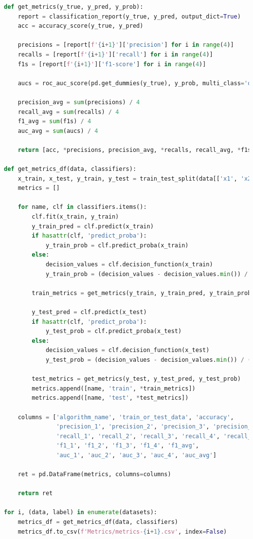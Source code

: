 \begin{lstlisting}[language=Python, caption=Generating metrics for all datasets and save them in CSV files, label={lst:Q4}]
def get_metrics(y_true, y_pred, y_prob):
    report = classification_report(y_true, y_pred, output_dict=True)
    acc = accuracy_score(y_true, y_pred)
    
    precisions = [report[f'{i+1}']['precision'] for i in range(4)]
    recalls = [report[f'{i+1}']['recall'] for i in range(4)]
    f1s = [report[f'{i+1}']['f1-score'] for i in range(4)]
    
    aucs = roc_auc_score(pd.get_dummies(y_true), y_prob, multi_class='ovr', average=None)
    
    precision_avg = sum(precisions) / 4
    recall_avg = sum(recalls) / 4
    f1_avg = sum(f1s) / 4
    auc_avg = sum(aucs) / 4
    
    return [acc, *precisions, precision_avg, *recalls, recall_avg, *f1s, f1_avg, *aucs, auc_avg]

def get_metrics_df(data, classifiers):
    x_train, x_test, y_train, y_test = train_test_split(data[['x1', 'x2']], data['y'], test_size=0.2, random_state=42)
    metrics = []

    for name, clf in classifiers.items():
        clf.fit(x_train, y_train) 
        y_train_pred = clf.predict(x_train)
        if hasattr(clf, 'predict_proba'):
            y_train_prob = clf.predict_proba(x_train)
        else:
            decision_values = clf.decision_function(x_train)
            y_train_prob = (decision_values - decision_values.min()) / (decision_values.max() - decision_values.min())
        
        train_metrics = get_metrics(y_train, y_train_pred, y_train_prob)

        y_test_pred = clf.predict(x_test)
        if hasattr(clf, 'predict_proba'):
            y_test_prob = clf.predict_proba(x_test)
        else:
            decision_values = clf.decision_function(x_test)
            y_test_prob = (decision_values - decision_values.min()) / (decision_values.max() - decision_values.min())
        
        test_metrics = get_metrics(y_test, y_test_pred, y_test_prob)
        metrics.append([name, 'train', *train_metrics])
        metrics.append([name, 'test', *test_metrics])
    
    columns = ['algorithm_name', 'train_or_test_data', 'accuracy',
               'precision_1', 'precision_2', 'precision_3', 'precision_4', 'precision_avg',
               'recall_1', 'recall_2', 'recall_3', 'recall_4', 'recall_avg',
               'f1_1', 'f1_2', 'f1_3', 'f1_4', 'f1_avg',
               'auc_1', 'auc_2', 'auc_3', 'auc_4', 'auc_avg']
    
    ret = pd.DataFrame(metrics, columns=columns)
    
    return ret

for i, (data, label) in enumerate(datasets):
    metrics_df = get_metrics_df(data, classifiers)
    metrics_df.to_csv(f'Metrics/metrics-{i+1}.csv', index=False)
\end{lstlisting}

